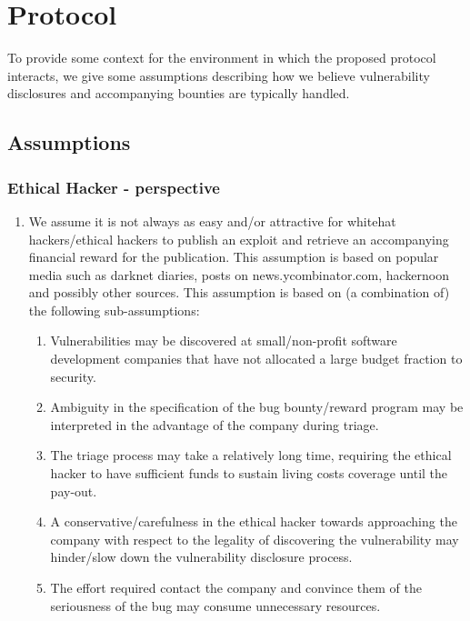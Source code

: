\section{Protocol}
\label{sec:protocol}
To provide some context for the environment in which the proposed protocol interacts, we give some assumptions describing how we believe vulnerability disclosures and accompanying bounties are typically handled.

\subsection{Assumptions}
\subsubsection{Ethical Hacker - perspective}
\begin{enumerate}
	\item We assume it is not always as easy and/or attractive for whitehat hackers/ethical hackers to publish an exploit and retrieve an accompanying financial reward for the publication. This assumption is based on popular media such as darknet diaries, posts on news.ycombinator.com, hackernoon and possibly other sources. This assumption is based on (a combination of) the following sub-assumptions:
	\begin{enumerate}
		\item Vulnerabilities may be discovered at small/non-profit software development companies that have not allocated a large budget fraction to security.
		\item Ambiguity in the specification of the bug bounty/reward program may be interpreted in the advantage of the company during triage.
		\item The triage process may take a relatively long time, requiring the ethical hacker to have sufficient funds to sustain living costs coverage until the pay-out.
		\item A conservative/carefulness in the ethical hacker towards approaching the company with respect to the legality of discovering the vulnerability may hinder/slow down the vulnerability disclosure process.
		\item The effort required contact the company and convince them of the seriousness of the bug may consume unnecessary resources.
	\end{enumerate}
\end{enumerate}

